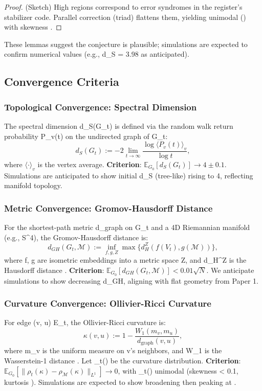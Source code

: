 \documentclass[11pt, a4paper]{article}
\begin{document}
\begin{proof}
(Sketch) High \kappa regions correspond to error syndromes in the register's stabilizer code. Parallel correction (triad) flattens them, yielding unimodal \rho(\kappa) with skewness .
\end{proof}

These lemmas suggest the conjecture is plausible; simulations are expected to confirm numerical values (e.g., d_S = 3.98  as anticipated).

\subsection{Convergence Criteria}

\subsubsection{Topological Convergence: Spectral Dimension}
The spectral dimension d_S(G_t) is defined via the random walk return probability P_v(t) on the undirected graph of G_t:
\[
d_S(G_t) := -2 \lim_{t \to \infty} \frac{\log \langle P_v(t) \rangle_v}{\log t},
\]
where \(\langle \cdot \rangle_v\) is the vertex average. \textbf{Criterion}: \(\mathbb{E}_{G_0} [d_S(G_t)] \to 4 \pm 0.1\). Simulations are anticipated to show initial d_S  (tree-like) rising to 4, reflecting manifold topology.

\subsubsection{Metric Convergence: Gromov-Hausdorff Distance}
For the shortest-path metric d_graph on G_t and a 4D Riemannian manifold  (e.g., S^4), the Gromov-Hausdorff distance is:
\[
d_{GH}(G_t, \mathcal{M}) := \inf_{f, g, Z} \max \{ d_H^Z(f(V_t), g(\mathcal{M})) \},
\]
where f, g are isometric embeddings into a metric space Z, and d_H^Z is the Hausdorff distance \cite{burago2001}. \textbf{Criterion}: \(\mathbb{E}_{G_0} [d_{GH}(G_t, \mathcal{M})] < 0.01 \sqrt{N}\). We anticipate simulations to show decreasing d_GH, aligning with flat geometry from Paper 1.

\subsubsection{Curvature Convergence: Ollivier-Ricci Curvature}
For edge (v, u) \in E_t, the Ollivier-Ricci curvature is:
\[
\kappa(v, u) := 1 - \frac{W_1(m_v, m_u)}{d_{\text{graph}}(v, u)},
\]
where m_v is the uniform measure on v’s neighbors, and W_1 is the Wasserstein-1 distance \cite{ollivier2009}. Let \rho_t(\kappa) be the curvature distribution. \textbf{Criterion}: \(\mathbb{E}_{G_0} [ \| \rho_t(\kappa) - \rho_{\mathcal{M}}(\kappa) \|_{L^1} ] \to 0\), with \rho_t(\kappa) unimodal (skewness < 0.1, kurtosis ). Simulations are expected to show broadening then peaking at \kappa {}.
\end{document}
